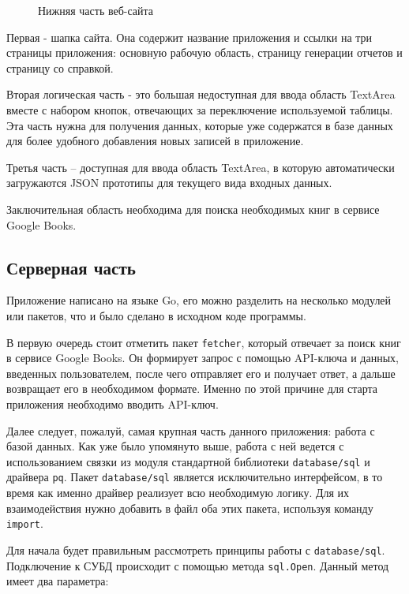\begin{figure}[h!]
    \caption{Нижняя часть веб-сайта}
    \label{ris:web_example_2}
\end{figure}

Первая - шапка сайта. Она содержит название 
приложения и ссылки на три страницы приложения: основную рабочую область, страницу генерации отчетов и страницу со 
справкой.

Вторая логическая часть - это большая недоступная для ввода область TextArea вместе с набором кнопок, 
отвечающих за переключение используемой таблицы. Эта часть нужна для получения данных, которые 
уже содержатся в базе данных для более удобного добавления новых записей в приложение.

Третья часть -- доступная для ввода область TextArea, в которую автоматически загружаются
JSON прототипы для текущего вида входных данных.

Заключительная область необходима для поиска необходимых книг в сервисе Google Books.

\subsection*{Серверная часть}

Приложение написано на языке Go, его можно разделить на несколько модулей или пакетов, что и было сделано
в исходном коде программы. 

В первую очередь стоит отметить пакет \texttt{fetcher}, который отвечает за
поиск книг в сервисе Google Books. Он формирует запрос с помощью API-ключа и данных,
введенных пользователем, после чего отправляет его и получает ответ, а дальше возвращает его в необходимом
формате. Именно по этой причине для старта приложения необходимо вводить API-ключ.

Далее следует, пожалуй, самая крупная часть данного приложения: работа с базой данных. Как уже было упомянуто
выше, работа с ней ведется с использованием связки из модуля стандартной библиотеки \texttt{database/sql} и
драйвера \texttt{pq}. Пакет \texttt{database/sql} является исключительно интерфейсом, в то время как именно
драйвер реализует всю необходимую логику. Для их взаимодействия нужно добавить в файл оба этих пакета, используя команду
\texttt{import}.

Для начала будет правильным рассмотреть принципы работы с \texttt{database/sql}.
Подключение к СУБД происходит с помощью метода \texttt{sql.Open}.
Данный метод имеет два параметра:

